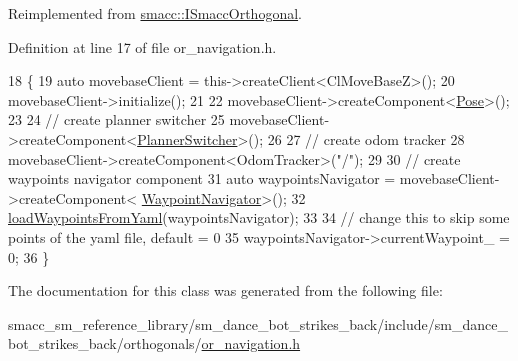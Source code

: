 Reimplemented from \hyperlink{classsmacc_1_1ISmaccOrthogonal_a6bb31c620cb64dd7b8417f8705c79c7a}{smacc\+::\+I\+Smacc\+Orthogonal}.



Definition at line 17 of file or\+\_\+navigation.\+h.


\begin{DoxyCode}
18     \{
19         \textcolor{keyword}{auto} movebaseClient = this->createClient<ClMoveBaseZ>();
20         movebaseClient->initialize();
21 
22         movebaseClient->createComponent<\hyperlink{classmove__base__z__client_1_1Pose}{Pose}>();
23 
24         \textcolor{comment}{// create planner switcher}
25         movebaseClient->createComponent<\hyperlink{classmove__base__z__client_1_1PlannerSwitcher}{PlannerSwitcher}>();
26 
27         \textcolor{comment}{// create odom tracker}
28         movebaseClient->createComponent<OdomTracker>(\textcolor{stringliteral}{"/"});
29 
30         \textcolor{comment}{// create waypoints navigator component}
31         \textcolor{keyword}{auto} waypointsNavigator = movebaseClient->createComponent<
      \hyperlink{classmove__base__z__client_1_1WaypointNavigator}{WaypointNavigator}>();
32         \hyperlink{classsm__dance__bot__strikes__back_1_1OrNavigation_abd8811831075be61ad28fe4a68fc738d}{loadWaypointsFromYaml}(waypointsNavigator);
33 
34         \textcolor{comment}{// change this to skip some points of the yaml file, default = 0}
35         waypointsNavigator->currentWaypoint\_ = 0;
36     \}
\end{DoxyCode}


The documentation for this class was generated from the following file\+:\begin{DoxyCompactItemize}
\item 
smacc\+\_\+sm\+\_\+reference\+\_\+library/sm\+\_\+dance\+\_\+bot\+\_\+strikes\+\_\+back/include/sm\+\_\+dance\+\_\+bot\+\_\+strikes\+\_\+back/orthogonals/\hyperlink{sm__dance__bot__strikes__back_2include_2sm__dance__bot__strikes__back_2orthogonals_2or__navigation_8h}{or\+\_\+navigation.\+h}\end{DoxyCompactItemize}
